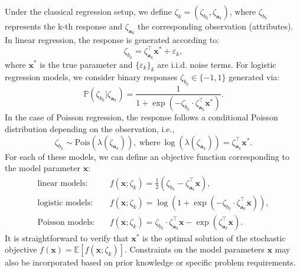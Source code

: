 \documentclass[aos]{imsart}
\numberwithin{equation}{section}
\theoremstyle{plain}
\begin{document}
Under the classical regression setup, we define $\zeta_k = \left(\zeta_{b_k}, \zeta_{\bm{a}_k} \right)$, where $\zeta_{b_k}$ represents the k-th response and $\zeta_{\bm{a}_k}$ the corresponding observation (attributes).
In linear regression, the response is generated according to:
\begin{equation*}
    \zeta_{b_k} = \zeta_{\bm{a}_k}^{\top} \bm{x}^{*} + \varepsilon_k,
\end{equation*}
where $\bm{x}^{*}$ is the true parameter and $\{\varepsilon_k\}_{k}$ are i.i.d. noise terms. For logistic regression models, we consider binary responses $\zeta_{b_k} \in \{-1,1\}$ generated via:
\begin{equation*}
    \mathbb{P}\left(\zeta_{b_k}| \zeta_{\bm{a}_k}\right) = \frac{1}{1 + \exp \left( -\zeta_{b_k} \cdot \zeta_{\bm{a}_k}^{\top} \bm{x}^{*} \right)}.
\end{equation*}
In the case of Poisson regression, the response follows a conditional Poisson distribution depending on the observation, i.e., 
\begin{equation*}
    \zeta_{b_k} \sim \text{Pois}\left( \lambda(\zeta_{\bm{a}_k})\right), ~\text{where}~\log(\lambda(\zeta_{\bm{a}_k})) =  \zeta_{\bm{a}_k}^{\top} \bm{x}^{*}.
\end{equation*}
For each of these models, we can define an objective function corresponding to the model parameter $\bm{x}$:
\begin{equation*}
    \begin{split}
        \text{linear models:} & \hspace{1em} f(\bm{x};\zeta_k) = \frac{1}{2} \left(\zeta_{b_k} - \zeta_{\bm{a}_k}^{\top} \bm{x} \right),\\
        \text{logistic models:} & \hspace{1em} f(\bm{x};\zeta_k) = \log\left(1 + \exp \left( -\zeta_{b_k} \cdot \zeta_{\bm{a}_k}^{\top} \bm{x}  \right) \right),\\
        \text{Poisson models:} & \hspace{1em} f(\bm{x};\zeta_k) = \zeta_{b_k} \cdot \zeta_{\bm{a}_k}^{\top} \bm{x} - \exp \left(\zeta_{\bm{a}_k}^{\top} \bm{x} \right).
    \end{split}
\end{equation*}
It is straightforward to verify that  $\bm{x}^{*}$ is the optimal solution of the stochastic objective $f(\bm{x}) = \mathbb{E}\left[ f(\bm{x};\zeta_k) 
 \right]$. Constraints on the model parameters $\bm{x}$ may also be incorporated based on prior knowledge or specific problem requirements.
\end{document}
